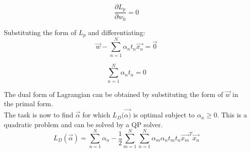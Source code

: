 \documentclass[11pt,a4paper]{article}
\newcommand{\noi}{\noindent}
\begin{document}
\begin{equation}
    \frac{\partial L_p}{\partial w_0}=0
\end{equation}

\noi
Substituting the form of $L_p$ and differentiating:
\begin{equation}
    \vec{w}-\sum_{n=1}^{N}\alpha_nt_n\vec{x_n}=\vec{0}
\end{equation}

\begin{equation}
    \sum_{n=1}^{N}\alpha_nt_n=0
\end{equation}

\noi
The dual form of Lagrangian can be obtained by substituting the form of $\vec{w}$ in the primal form.\\ 
The task is now to find $\vec{\alpha}$ for which $L_D(\vec{\alpha)}$ is optimal subject to $\alpha_n\geq 0$. This is a quadratic problem and can be solved by a QP solver.
\begin{equation}
    L_D(\vec{\alpha})=\sum_{n=1}^{N}\alpha_n-\frac{1}{2}\sum_{m=1}^{N}\sum_{n=1}^{N}\alpha_m\alpha_nt_mt_n\vec{x_m}^T\vec{x_n} 
\end{equation}
\end{document}
